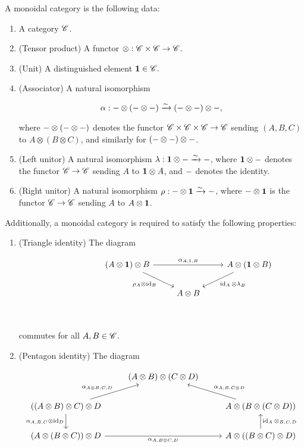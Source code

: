 \begin{definition} A monoidal category is the following data:

\begin{enumerate}
\item A category $\mathscr{C}$.
\item (Tensor product) A functor $\otimes: \mathscr{C} \times \mathscr{C} \to \mathscr{C}$.
\item (Unit) A distinguished element $\mathbf{1}\in \mathscr{C}.$
\item (Associator) A natural isomorphism

$$\alpha: \--\otimes (\-- \otimes \--) \xrightarrow{\sim} (\--\otimes \--)\otimes \-- , $$

where $\-- \otimes (\--\otimes \--)$ denotes the functor $\mathscr{C}\times \mathscr{C}\times \mathscr{C}\to\mathscr{C}$ sending $(A,B,C)$ to $A\otimes (B\otimes C)$, and similarly for $(\-- \otimes \-- )\otimes\--$.
\item (Left unitor) A natural isomorphism $\lambda: \mathbf{1}\otimes \-- \xrightarrow{\sim} \--$, where $\mathbf{1}\otimes \--$ denotes the functor $\mathscr{C}\to \mathscr{C}$ sending $A$ to $\mathbf{1}\otimes A$, and $\--$ denotes the identity.
\item (Right unitor) A natural isomorphism $\rho: \--\otimes \mathbf{1} \xrightarrow{\sim} \--$, where $\--\otimes \mathbf{1}$ is the functor $\mathscr{C}\to \mathscr{C}$ sending $A$ to $A\otimes \mathbf{1}$.
\end{enumerate}

Additionally, a monoidal category is required to satisfy the following properties:

\begin{enumerate}
\item (Triangle identity) The diagram

\[\begin{tikzcd}
	{} & {} & {\left(A\otimes \one\right)\otimes B} & {} & {A\otimes (\one\otimes B)} \\
	&& {} & {A\otimes B} \\
	&&&& {}
	\arrow["{\alpha_{A,1,B}}", from=1-3, to=1-5]
	\arrow["{\rho_A\otimes \id_B}"', from=1-3, to=2-4]
	\arrow["{\id_A\otimes \lambda_B}", from=1-5, to=2-4]
\end{tikzcd}\]

commutes for all $A,B\in \mathscr{C}$.

\item (Pentagon identity) The diagram

\[\begin{tikzcd}
	& {(A\otimes B)\otimes(C\otimes D)} \\
	{((A\otimes B)\otimes C)\otimes D} && {A\otimes (B\otimes (C\otimes D))} \\
	{(A\otimes (B\otimes C))\otimes D} && {A\otimes((B\otimes C)\otimes D)}
	\arrow["{\alpha_{A\otimes B, C,D}}", from=2-1, to=1-2]
	\arrow["{\alpha_{A,B,{C\otimes D}}}"', from=2-3, to=1-2]
	\arrow["{\alpha_{A,B,C}\otimes \id_D}"', from=2-1, to=3-1]
	\arrow["{\id_A\otimes_{B,C,D}}"', from=3-3, to=2-3]
	\arrow["{\alpha_{A,B\otimes C,D}}"', from=3-1, to=3-3]
\end{tikzcd}\]


\end{enumerate}
\end{definition}
